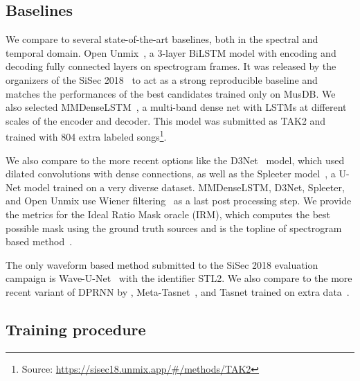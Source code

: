 \subsection{Baselines}

We compare to several state-of-the-art baselines, both in the spectral and temporal domain.
Open Unmix~\citep{openunmix}, a 3-layer BiLSTM model with encoding and decoding fully connected layers
on spectrogram frames. It was released by the organizers of the SiSec 2018~\citep{sisec} to act as a strong reproducible baseline and matches the
performances of the best candidates trained only on MusDB.
We also selected MMDenseLSTM~\citep{sony_denselstm}, a multi-band dense net with LSTMs at different scales of the encoder and decoder.
This model was submitted as \textsc{TAK2} and trained with 804 extra labeled songs\footnote{Source: \url{https://sisec18.unmix.app/\#/methods/TAK2}}.

We also compare to the more recent options like the D3Net~\citep{takahashi2020d3net} model, which used dilated convolutions with dense connections, as well as the Spleeter model~\citep{spleeter2020}, a U-Net model trained on a very diverse dataset.
MMDenseLSTM, D3Net, Spleeter, and Open Unmix use Wiener filtering~\citep{multichannel_deep} as a last post processing step.
We provide the metrics for the Ideal Ratio Mask oracle (IRM), which computes the best possible mask using the ground truth sources
and is the topline of spectrogram based method~\citep{sisec}.

The only waveform based method submitted to the SiSec 2018 evaluation campaign is Wave-U-Net~\citep{wavunet} with the identifier \textsc{STL2}.
We also compare to the more recent variant of DPRNN by \citet{nachmani2020voice}, Meta-Tasnet~\citep{samuel2020meta}, and
Tasnet trained on extra data~\citep{lancaster2020frugal}.




\subsection{Training procedure}
\label{sec:training}

